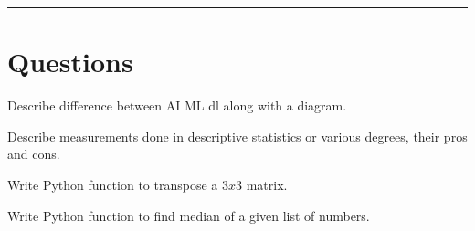 \documentclass[11pt,paper=a4]{exam}
\begin{document}
\rule{\textwidth}{1pt}
\section*{Questions}

\begin{questions}
\question[4] Describe difference between AI ML dl along with a diagram.

\question[6]  Describe measurements done in descriptive statistics or various degrees, their pros and cons.

\question[4] Write Python function to transpose a $3x3$ matrix.

\question[6] Write Python function to find median of a given list of numbers.

\end{questions}
\end{document}
